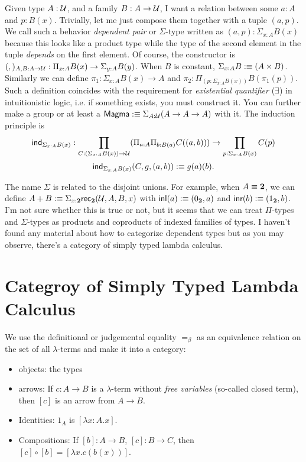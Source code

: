 Given type $A:\mathcal{U}$, and a family $B:A\to\mathcal{U}$, I want a relation
between some $a: A$ and $p: B(x)$. Trivially, let me just compose them
together with a tuple $(a, p)$. We call such a behavior {\it dependent 
pair} or $\Sigma$-type written as $(a,p):\Sigma_{x:A}B(x)$ because this 
looks like a product type while the type of the second element in the
tuple {\it depends} on the first element. Of course, the constructor
is $(,)_{A,B:A\to\mathcal{U}}: \Pi_{x:A}B(x)\to\Sigma_{y:A}B(y)$.
When $B$ is constant, $\Sigma_{x:A}B:\equiv(A\times B)$. Similarly we can
define $\pi_1:\Sigma_{x:A}B(x)\to A$ and 
$\pi_2:\Pi_{(p: \Sigma_{x:A}B(x))}B(\pi_1(p))$. Such a definition coincides
with the requirement for {\it existential quantifier} ($\exists$) in
intuitionistic logic, i.e. if something exists, you must construct it.
You can further make a group or at least a 
$\text{\sf Magma}:\equiv \Sigma_{A:\mathcal{U}}(A\to A\to A)$ with it.
The induction principle is
$$
    \text{\sf ind}_{\Sigma_{x:A}B(x)}:\prod_{C:(\Sigma_{x:A}B(x))\to\mathcal{U}}
    (\Pi_{a:A}\Pi_{b:B(a)}C((a, b)))\to
    \prod_{p: \Sigma_{x:A}B(x)} C(p)
$$
$$
    \text{\sf ind}_{\Sigma_{x:A}B(x)}(C,g,(a,b)) :\equiv g(a)(b).
$$

The name $\Sigma$ is related to the disjoint unions. For example,
when $A\equiv \mathbf{2}$, we can define 
$A+B:\equiv \Sigma_{x:\mathbf{2}}\text{\sf rec}_{\mathbf{2}}(\mathcal{U},A,B,x)$ with 
$\text{\sf inl}(a):\equiv(0_{\mathbf{2}},a)$ and $\text{\sf inr}(b):\equiv(1_{\mathbf{2}},b)$. I'm not sure
whether this is true or not, but it seems that we can treat $\Pi$-types
and $\Sigma$-types as products and coproducts of indexed families of 
types. I haven't found any material about how to categorize dependent
types but as you may observe, there's a category of simply typed lambda
calculus. 

\section{Categroy of Simply Typed Lambda Calculus}
We use the definitional or judgemental equality $=_\beta$ as an
equivalence relation on the set of all $\lambda$-terms and make it
into a category:

\begin{itemize}[label={}]
    \item objects: the types
    \item arrows: If $c: A\to B$ is a $\lambda$-term without {\it free
    variables} (so-called closed term), then $[c]$ is an arrow from
    $A\to B$.
    \item Identities: $1_A$ is $[\lambda x: A.x]$.
    \item Compositions: If $[b]: A \to B$, $[c]: B\to C$, then
    $[c]\circ [b] = [\lambda x. c(b(x))]$.
\end{itemize}

